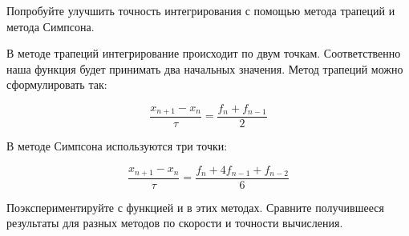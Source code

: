     Попробуйте улучшить точность интегрирования с помощью
    метода трапеций и метода Симпсона.

    В методе трапеций интегрирование происходит по двум
    точкам. Соответственно наша функция  будет
    принимать два начальных значения. Метод трапеций
    можно сформулировать так:

    \[  \frac{x_{n+1} - x_n}{\tau} = \frac{f_n + f_{n-1}}{2} \]

    В методе Симпсона используются три точки:

    \[  \frac{x_{n+1} - x_n}{\tau} = \frac{f_n + 4 f_{n-1}+f_{n-2}}{6} \]


    Поэкспериментируйте с функцией  и в этих методах.
    Сравните получившееся результаты для разных методов по скорости
    и точности вычисления.


